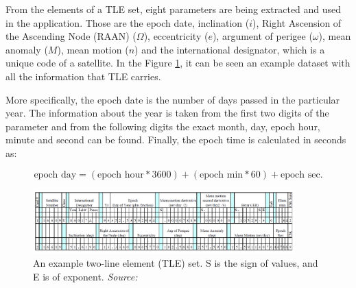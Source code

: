 From the elements of a TLE set, eight parameters are being extracted and used in the application. Those are the epoch date, inclination ($i$), Right Ascension of the Ascending Node (RAAN) ($\Omega$), eccentricity ($e$), argument of perigee ($\omega$), mean anomaly ($M$), mean motion ($n$) and the international designator, which is a unique code of a satellite. In the Figure \ref{tle}, it can be seen an example dataset with all the information that TLE carries.


More specifically, the epoch date is the number of days passed in the particular year. The information about the year is taken from the first two digits of the parameter and from the following digits the exact month, day, epoch hour, minute and second can be found. Finally, the epoch time is calculated in seconds as:

\begin{equation}
\label{epoch}
\text{epoch day} = (\text{epoch hour} * 3600) + (\text{epoch min} * 60) + \text{epoch sec}.
\end{equation}


\begin{figure}
\centering
\includegraphics[width=0.9\textwidth]{Images/tle.png}\caption{An example two-line element (TLE) set. S is the sign of values, and E is of exponent. \textit{Source: \cite{Vallado}}}
\label{tle} 
\end{figure}

